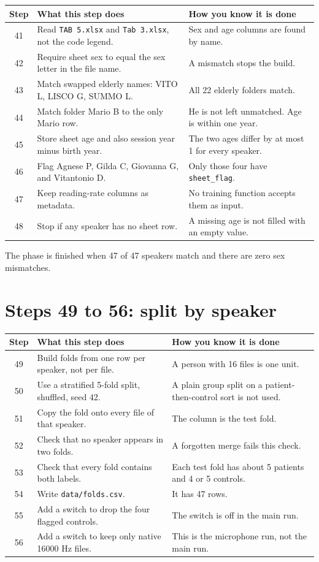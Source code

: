\documentclass[11pt]{article}
\begin{document}
\begin{longtable}{cp{6.4cm}p{6.4cm}}
\toprule
Step & What this step does & How you know it is done \\
\midrule
\endhead
41 & Read \texttt{TAB 5.xlsx} and \texttt{Tab 3.xlsx}, not the code legend. & Sex and age columns are found by name. \\
42 & Require sheet sex to equal the sex letter in the file name. & A mismatch stops the build. \\
43 & Match swapped elderly names: VITO L, LISCO G, SUMMO L. & All 22 elderly folders match. \\
44 & Match folder Mario B to the only Mario row. & He is not left unmatched. Age is within one year. \\
45 & Store sheet age and also session year minus birth year. & The two ages differ by at most 1 for every speaker. \\
46 & Flag Agnese P, Gilda C, Giovanna G, and Vitantonio D. & Only those four have \texttt{sheet\_flag}. \\
47 & Keep reading-rate columns as metadata. & No training function accepts them as input. \\
48 & Stop if any speaker has no sheet row. & A missing age is not filled with an empty value. \\
\bottomrule
\end{longtable}

The phase is finished when 47 of 47 speakers match and there are zero sex mismatches.

\section{Steps 49 to 56: split by speaker}

\begin{longtable}{cp{6.4cm}p{6.4cm}}
\toprule
Step & What this step does & How you know it is done \\
\midrule
\endhead
49 & Build folds from one row per speaker, not per file. & A person with 16 files is one unit. \\
50 & Use a stratified 5-fold split, shuffled, seed 42. & A plain group split on a patient-then-control sort is not used. \\
51 & Copy the fold onto every file of that speaker. & The column is the test fold. \\
52 & Check that no speaker appears in two folds. & A forgotten merge fails this check. \\
53 & Check that every fold contains both labels. & Each test fold has about 5 patients and 4 or 5 controls. \\
54 & Write \texttt{data/folds.csv}. & It has 47 rows. \\
55 & Add a switch to drop the four flagged controls. & The switch is off in the main run. \\
56 & Add a switch to keep only native 16000 Hz files. & This is the microphone run, not the main run. \\
\bottomrule
\end{longtable}
\end{document}
